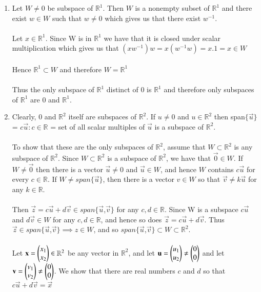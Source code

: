 \documentclass[journal,12pt,twocolumn]{IEEEtran}
\begin{document}
\begin{enumerate}[label=\alph*.]
\item 
Let $W \neq {0}$ be subspace of $\mathbb{R}^1$. Then $W$ is a nonempty subset of $\mathbb{R}^1$ and there exist $w \in W$ such that $w \neq 0$ which gives us that there exist $w^{-1}$.\\
\\
Let $x\in\mathbb{R}^1$. Since W is in $\mathbb{R}^1$ we have that it is closed under scalar multiplication which gives us that $(xw^{-1})w=x(w^{-1}w)=x.1=x \in W$\\
\\
Hence $\mathbb{R}^1 \subset W$ and therefore $ W = \mathbb{R}^1$\\
\\
Thus the only subspace of $\mathbb{R}^1$ distinct of {0} is $\mathbb{R}^1$ and therefore only subspaces of $\mathbb{R}^1$ are {0} and $\mathbb{R}^1$. 
\\
\item
Clearly, {0} and $\mathbb{R}^2$ itself are subspaces of $\mathbb{R}^2$. If $u \neq 0$ and $u \in \mathbb{R}^2$ then span$\{\vec{u}\}$ = ${c\vec{u}: c\in \mathbb{R}}$ = set of all scalar multiples of $\vec{u}$ is a subspace of $\mathbb{R}^2$.\\
\\
To show that these are the only subspaces of $\mathbb{R}^2$, assume that $W \subset \mathbb{R}^2$ is any subspace of $\mathbb{R}^2$. Since $W\subset\mathbb{R}^2$ is a subspace of $\mathbb{R}^2$, we have that $\vec{0} \in W$. If $W \neq {\vec{0}}$ then there is a vector $\vec{u} \neq 0$ and $\vec{u} \in W$, and hence $W$ contains $c\vec{u}$ for every $c \in \mathbb{R}$. If $W \neq span\{\vec{u}\}$, then there is a vector $v \in W$ so that $\vec{v} \neq k\vec{u}$ for any $k \in \mathbb{R}$.\\
\\
Then $\vec{z} = c\vec{u} + d\vec{v} \in span\{\vec{u}$,$\vec{v}\}$ for any $c,d \in \mathbb{R}$. Since W is a subspace $c\vec{u}$ and $d\vec{v} \in W$ for any $c,d \in \mathbb{R}$, and hence so does $\vec{z} = c\vec{u} + d\vec{v}$. Thus $\vec{z} \in span\{\vec{u}$,$\vec{v}\} \implies z \in W$, and so $span\{\vec{u}$,$\vec{v}\} \subset W \subset \mathbb{R}^2$.\\
\\
Let $\mathbf{x} = \begin{pmatrix}x_1 \\x_2\end{pmatrix} \in \mathbb{R}^2$ be any vector in $\mathbb{R}^2$, and let $\mathbf{u} = \begin{pmatrix}u_1\\u_2\end{pmatrix} \neq \begin{pmatrix}0\\0\end{pmatrix}$ and let $\mathbf{v} = \begin{pmatrix}v_1\\v_2\end{pmatrix} \neq \begin{pmatrix}0\\0\end{pmatrix}$. We show that there are real numbers $c$ and $d$ so that $c\vec{u} + d\vec{v} = \vec{x}$

\end{enumerate}
\end{document}
